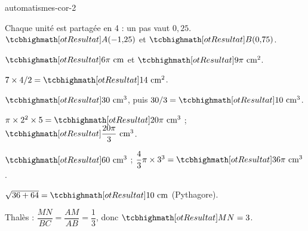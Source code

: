 \begin{blocEdition}{automatismes-cor-2}
\begin{deuxcolonnes}\begin{questions}
\item \begin{minipage}[t]{\linewidth}\raggedright\leavevmode {}\enspace Chaque unité est partagée en 4 : un pas vaut $0{,}25$. $\res{A(-1{,}25)}$ et $\res{B(0{,}75)}$.\end{minipage}
\item \begin{minipage}[t]{\linewidth}\raggedright\leavevmode {}\enspace $\res{6\pi\text{ cm}}$ et $\res{9\pi\text{ cm}^2}$.\end{minipage}
\item \begin{minipage}[t]{\linewidth}\raggedright\leavevmode {}\enspace $7\times4/2=\res{14\text{ cm}^2}$.\end{minipage}
\item \begin{minipage}[t]{\linewidth}\raggedright\leavevmode {}\enspace $\res{30\text{ cm}^3}$, puis $30/3=\res{10\text{ cm}^3}$.\end{minipage}
\item \begin{minipage}[t]{\linewidth}\raggedright\leavevmode {}\enspace $\pi\times2^2\times5=\res{20\pi\text{ cm}^3}$ ; $\res{\dfrac{20\pi}3\text{ cm}^3}$.\end{minipage}
\item \begin{minipage}[t]{\linewidth}\raggedright\leavevmode {}\enspace $\res{60\text{ cm}^3}$ ; $\dfrac43\pi\times3^3=\res{36\pi\text{ cm}^3}$.\end{minipage}
\item \begin{minipage}[t]{\linewidth}\raggedright\leavevmode {}\enspace $\sqrt{36+64}=\res{10\text{ cm}}$ (Pythagore).\end{minipage}
\item \begin{minipage}[t]{\linewidth}\raggedright\leavevmode {}\enspace Thalès : $\dfrac{MN}{BC}=\dfrac{AM}{AB}=\dfrac13$, donc $\res{MN=3}$.\end{minipage}

\end{questions}
\end{deuxcolonnes}
\end{blocEdition}
